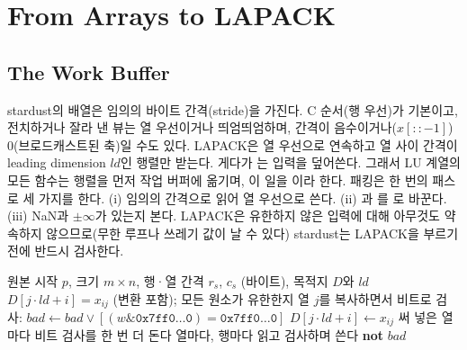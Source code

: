 \section{From Arrays to LAPACK}
\label{sec:lu-packing}

\subsection{The Work Buffer}

stardust의 배열은 임의의 바이트 간격(stride)을 가진다. C 순서(행 우선)가 기본이고, 전치하거나 잘라 낸 뷰는 열 우선이거나 띄엄띄엄하며, 간격이 음수이거나($x[::-1]$) $0$(브로드캐스트된 축)일 수도 있다. LAPACK은 열 우선으로 연속하고 열 사이 간격이 leading dimension $\mathit{ld}$인 행렬만 받는다. 게다가 는 입력을 덮어쓴다. 그래서 LU 계열의 모든 함수는 행렬을 먼저 작업 버퍼에 옮기며, 이 일을 이라 한다. 패킹은 한 번의 패스로 세 가지를 한다. (i) 임의의 간격으로 읽어 열 우선으로 쓴다. (ii) 과 를 로 바꾼다. (iii) NaN과 $\pm\infty$가 있는지 본다. LAPACK은 유한하지 않은 입력에 대해 아무것도 약속하지 않으므로(무한 루프나 쓰레기 값이 날 수 있다) stardust는 LAPACK을 부르기 전에 반드시 검사한다.

\begin{algorithm}[t]
\begin{algorithmic}[1]
\Require 원본 시작 $p$, 크기 $m\times n$, 행·열 간격 $r_s$, $c_s$ (바이트), 목적지 $D$와 $\mathit{ld}$
\Ensure $D[j\cdot\mathit{ld}+i]=x_{ij}$ (변환 포함); 모든 원소가 유한한지
 
    \State 열 $j$를 복사하면서 비트로 검사: $\mathit{bad}\gets\mathit{bad}\lor[(w\mathbin{\&}\mathtt{0x7ff0\ldots0})=\mathtt{0x7ff0\ldots0}]$
  \EndFor
{} 
   
    \For{$j\in[j_0,j_0+32)$} \For{$i\in[i_0,i_0+32)$}
      \State $D[j\cdot\mathit{ld}+i]\gets x_{ij}$
    \EndFor\EndFor
  \EndFor\EndFor
  \State 써 넣은 열마다 비트 검사를 한 번 더 돈다
\Else {}
  \State 열마다, 행마다 읽고 검사하며 쓴다
\EndIf
\State \Return \textbf{not} $\mathit{bad}$
\end{algorithmic}
\caption{패킹 (stardust 의 세 경로, 실수 의 경우)}
\label{alg:lu-pack}
\end{algorithm}

